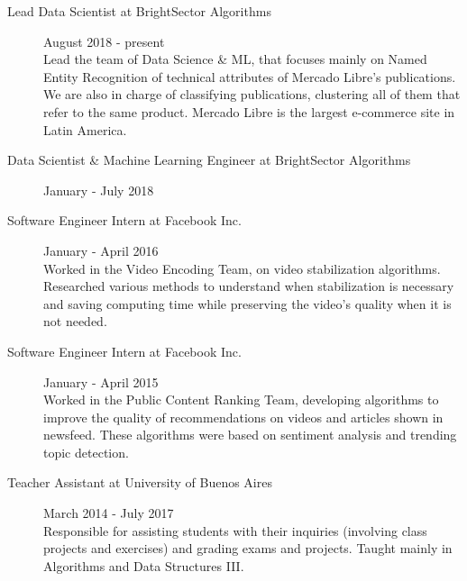 \documentclass [a4paper, 11pt]{article}
\begin{document}
\begin{description}
  \item[Lead Data Scientist at BrightSector Algorithms] {\hfill August 2018 - present\\
    Lead the team of Data Science \& ML, that focuses mainly on Named Entity Recognition of technical 
    attributes of Mercado Libre's publications. We are also in charge of classifying publications, clustering
    all of them that refer to the same product. Mercado Libre is the largest e-commerce site in Latin America.
  }

  \item[Data Scientist \& Machine Learning Engineer at BrightSector Algorithms] {\hfill January - July 2018\\
  }

  \item[Software Engineer Intern at Facebook Inc.] {\hfill January - April 2016\\
  Worked in the Video Encoding Team, on video stabilization algorithms. Researched various methods to 
  understand when stabilization is necessary and saving computing time while preserving the video's quality when it is not needed. 

}

  \item[Software Engineer Intern at Facebook Inc.] {\hfill January - April 2015\\
Worked in the Public Content Ranking Team, developing algorithms to improve the quality of recommendations on videos and articles shown in newsfeed. These algorithms were based on sentiment analysis and trending topic detection. %
}

  \item[Teacher Assistant at University of Buenos Aires] {\hfill March 2014 - July 2017\\
  Responsible for assisting students with their inquiries (involving class projects and 
  exercises) and grading exams and projects. Taught mainly in Algorithms 
  and Data Structures III.
}


\end{description}
\end{document}
